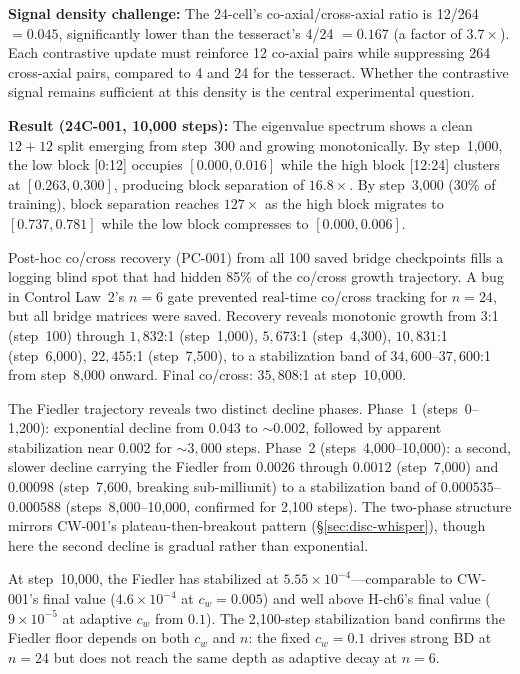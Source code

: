 \textbf{Signal density challenge:} The 24-cell's co-axial/cross-axial ratio
is 12/264 $= 0.045$, significantly lower than the tesseract's 4/24 $= 0.167$
(a factor of $3.7\times$). Each contrastive update must reinforce 12 co-axial
pairs while suppressing 264 cross-axial pairs, compared to 4 and 24 for the
tesseract. Whether the contrastive signal remains sufficient at this density
is the central experimental question.

\textbf{Result (24C-001, 10{,}000 steps):} The eigenvalue
spectrum shows a clean $12{+}12$ split emerging from step~300 and growing
monotonically. By step~1{,}000, the low block [0:12] occupies
$[0.000, 0.016]$ while the high block [12:24] clusters at $[0.263, 0.300]$,
producing block separation of $16.8\times$. By step~3{,}000 (30\% of
training), block separation reaches $127\times$ as the high block migrates
to $[0.737, 0.781]$ while the low block compresses to $[0.000, 0.006]$.

Post-hoc co/cross recovery (PC-001) from all 100 saved bridge checkpoints
fills a logging blind spot that had hidden 85\% of the co/cross growth
trajectory. A bug in Control Law~2's $n{=}6$ gate prevented real-time
co/cross tracking for $n{=}24$, but all bridge matrices were saved.
Recovery reveals monotonic growth from $3$:1 (step~100) through
$1{,}832$:1 (step~1{,}000), $5{,}673$:1 (step~4{,}300), $10{,}831$:1
(step~6{,}000), $22{,}455$:1 (step~7{,}500), to a stabilization band of
$34{,}600$--$37{,}600$:1 from step~8{,}000 onward. Final co/cross:
$35{,}808$:1 at step~10{,}000.

The Fiedler trajectory reveals two distinct decline phases. Phase~1
(steps~0--1{,}200): exponential decline from $0.043$ to ${\sim}0.002$,
followed by apparent stabilization near $0.002$ for ${\sim}3{,}000$ steps.
Phase~2 (steps~4{,}000--10{,}000): a second, slower decline carrying the
Fiedler from $0.0026$ through $0.0012$ (step~7{,}000) and $0.00098$
(step~7{,}600, breaking sub-milliunit) to a stabilization band of
$0.000535$--$0.000588$ (steps~8{,}000--10{,}000, confirmed for 2{,}100
steps). The two-phase structure mirrors CW-001's plateau-then-breakout
pattern (\S\ref{sec:disc-whisper}), though here the second decline is gradual
rather than exponential.

At step~10{,}000, the Fiedler has stabilized at
$5.55 \times 10^{-4}$---comparable to CW-001's final value ($4.6 \times
10^{-4}$ at $c_w{=}0.005$) and well above H-ch6's final value ($9 \times
10^{-5}$ at adaptive $c_w$ from $0.1$). The 2{,}100-step stabilization
band confirms the Fiedler floor depends on both $c_w$ and $n$: the fixed
$c_w{=}0.1$ drives strong BD at $n{=}24$ but does not reach the same
depth as adaptive decay at $n{=}6$.

